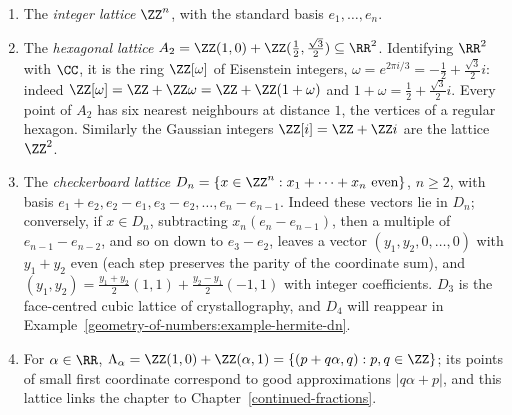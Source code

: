 \begin{example}\label{geometry-of-numbers:example-lattices}
\begin{enumerate}
\item The \emph{integer lattice} $\ZZ^n$, with the standard basis $e_1, \ldots, e_n$.
\item The \emph{hexagonal lattice} $A_2 = \ZZ(1, 0) + \ZZ(\frac12, \frac{\sqrt3}{2}) \subseteq \RR^2$. Identifying $\RR^2$ with $\CC$, it is the ring $\ZZ[\omega]$ of Eisenstein integers,
$\omega = e^{2\pi i/3} = -\frac12 + \frac{\sqrt3}{2}i$: indeed $\ZZ[\omega] = \ZZ + \ZZ\omega = \ZZ + \ZZ(1 + \omega)$ and $1 + \omega = \frac12 + \frac{\sqrt3}{2}i$. Every point of $A_2$ has six nearest neighbours at distance $1$, the vertices of a regular
hexagon. Similarly the Gaussian integers $\ZZ[i] = \ZZ + \ZZ i$ are the lattice $\ZZ^2$.
\item The \emph{checkerboard lattice} $D_n = \{x \in \ZZ^n : x_1 + \cdots + x_n \text{ even}\}$, $n \geq 2$, with basis $e_1 + e_2, e_2 - e_1, e_3 - e_2, \ldots, e_n - e_{n-1}$. Indeed these vectors lie
in $D_n$; conversely, if $x \in D_n$, subtracting $x_n(e_n - e_{n-1})$, then a multiple of $e_{n-1} - e_{n-2}$, and so on down to $e_3 - e_2$, leaves a vector $(y_1, y_2, 0, \ldots, 0)$ with $y_1 + y_2$
even (each step preserves the parity of the coordinate sum), and $(y_1, y_2) = \frac{y_1 + y_2}{2}(1, 1) + \frac{y_2 - y_1}{2}(-1, 1)$ with integer coefficients. $D_3$ is the
face-centred cubic lattice of crystallography, and $D_4$ will reappear in Example~\ref{geometry-of-numbers:example-hermite-dn}.
\item For $\alpha \in \RR$, $\Lambda_\alpha = \ZZ(1, 0) + \ZZ(\alpha, 1) = \{(p + q\alpha, q) : p, q \in \ZZ\}$; its points of small first coordinate correspond to good approximations
$|q\alpha + p|$, and this lattice links the chapter to Chapter~\ref{continued-fractions}.
\end{enumerate}
\end{example}

